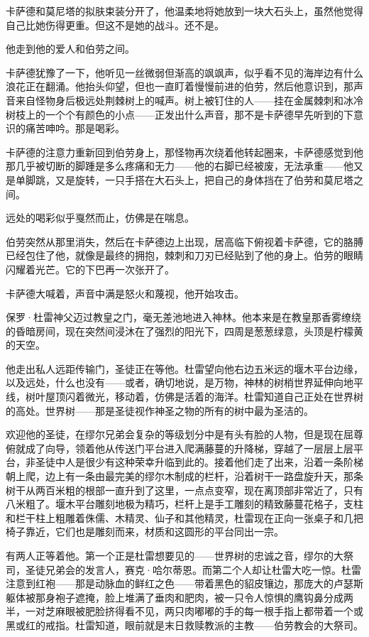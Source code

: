 \documentclass[AutoFakeBold=true]{book}
\begin{document}
卡萨德和莫尼塔的拟肤束装分开了，他温柔地将她放到一块大石头上，虽然他觉得自己比她伤得更重。但这不是她的战斗。还不是。

他走到他的爱人和伯劳之间。

卡萨德犹豫了一下，他听见一丝微弱但渐高的飒飒声，似乎看不见的海岸边有什么浪花正在翻涌。他抬头仰望，但也一直盯着慢慢前进的伯劳，然后他意识到，那声音来自怪物身后极远处荆棘树上的喊声。树上被钉住的人——挂在金属棘刺和冰冷树枝上的一个个有颜色的小点——正发出什么声音，那不是卡萨德早先听到的下意识的痛苦呻吟。那是喝彩。

卡萨德的注意力重新回到伯劳身上，那怪物再次绕着他转起圈来，卡萨德感觉到他那几乎被切断的脚踵是多么疼痛和无力——他的右脚已经被废，无法承重——他又是单脚跳，又是旋转，一只手搭在大石头上，把自己的身体挡在了伯劳和莫尼塔之间。

远处的喝彩似乎戛然而止，仿佛是在喘息。

伯劳突然从那里消失，然后在卡萨德边上出现，居高临下俯视着卡萨德，它的胳膊已经包住了他，就像是最终的拥抱，棘刺和刀刃已经贴到了他的身上。伯劳的眼睛闪耀着光芒。它的下巴再一次张开了。

卡萨德大喊着，声音中满是怒火和蔑视，他开始攻击。

\vspace*{1em}

保罗·杜雷神父迈过教皇之门，毫无差池地进入神林。他本来是在教皇那香雾缭绕的昏暗房间，现在突然间浸沐在了强烈的阳光下，四周是葱葱绿意，头顶是柠檬黄的天空。

他走出私人远距传输门，圣徒正在等他。杜雷望向他右边五米远的堰木平台边缘，以及远处，什么也没有——或者，确切地说，是万物，神林的树梢世界延伸向地平线，树叶屋顶闪着微光，移动着，仿佛是活着的海洋。杜雷知道自己正处在世界树的高处。世界树——那是圣徒视作神圣之物的所有的树中最为圣洁的。

欢迎他的圣徒，在缪尔兄弟会复杂的等级划分中是有头有脸的人物，但是现在屈尊俯就成了向导，领着他从传送门平台进入爬满藤蔓的升降梯，穿越了一层层上层平台，非圣徒中人是很少有这种荣幸升临到此的。接着他们走了出来，沿着一条阶梯朝上爬，边上有一条由最完美的缪尔木制成的栏杆，沿着树干一路盘旋升天，那条树干从两百米粗的根部一直升到了这里，一点点变窄，现在离顶部非常近了，只有八米粗了。堰木平台雕刻地极为精巧，栏杆上是手工雕刻的精致藤蔓花格子，支柱和栏干柱上粗雕着侏儒、木精灵、仙子和其他精灵，杜雷现在正向一张桌子和几把椅子靠近，它们也是雕刻而来，材质和这圆形的平台同出一宗。

有两人正等着他。第一个正是杜雷想要见的——世界树的忠诚之音，缪尔的大祭司，圣徒兄弟会的发言人，赛克·哈尔蒂恩。而第二个人却让杜雷大吃一惊。杜雷注意到红袍——那是动脉血的鲜红之色——带着黑色的貂皮镶边，那庞大的卢瑟斯躯体被那身袍子遮掩，脸上堆满了垂肉和肥肉，被一只令人惊惧的鹰钩鼻分成两半，一对芝麻眼被肥脸挤得看不见，两只肉嘟嘟的手的每一根手指上都带着一个或黑或红的戒指。杜雷知道，眼前就是末日救赎教派的主教——伯劳教会的大祭司。
\end{document}
